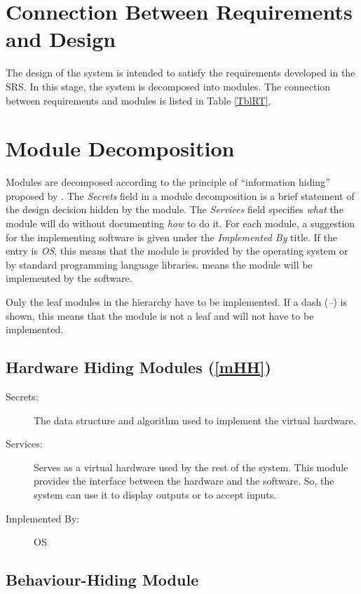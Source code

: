 \documentclass[12pt, titlepage]{article}
\begin{document}
\section{Connection Between Requirements and Design} \label{SecConnection}

The design of the system is intended to satisfy the requirements developed in the SRS. In this
stage, the system is decomposed into modules. The connection between requirements and modules is
listed in Table \ref{TblRT}.

\section{Module Decomposition} \label{SecMD}

Modules are decomposed according to the principle of ``information hiding'' proposed by
\citet{ParnasEtAl1984}. The \emph{Secrets} field in a module decomposition is a brief statement of
the design decision hidden by the module. The \emph{Services} field specifies \emph{what} the
module will do without documenting \emph{how} to do it. For each module, a suggestion for the
implementing software is given under the \emph{Implemented By} title. If the entry is \emph{OS},
this means that the module is provided by the operating system or by standard programming language
libraries. \emph{\progname{}} means the module will be implemented by the \progname{} software.

Only the leaf modules in the hierarchy have to be implemented. If a dash (\emph{--}) is shown, this
means that the module is not a leaf and will not have to be implemented.

\subsection{Hardware Hiding Modules (\ref{mHH})}

\begin{description}
	\item[Secrets:]The data structure and algorithm used to implement the virtual hardware.
	\item[Services:]Serves as a virtual hardware used by the rest of the system. This module provides the
	interface between the hardware and the software. So, the system can use it to display outputs or to
	accept inputs.
	\item[Implemented By:] OS
\end{description}

\subsection{Behaviour-Hiding Module}
\end{document}
